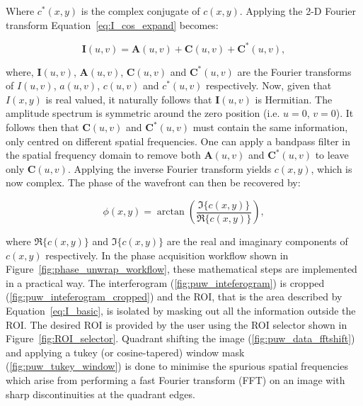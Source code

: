 Where $c^{*}(x,y)$ is the complex conjugate of $c(x,y)$. Applying the 2-D Fourier transform Equation~\ref{eq:I_cos_expand} becomes:

\begin{equation}\label{eq:I_fourier}
\boldsymbol{I}(u,v) = \boldsymbol{A}(u,v) + \boldsymbol{C}(u,v) + \boldsymbol{C}^{*}(u,v),
\end{equation}

where, $\boldsymbol{I}(u,v)$, $\boldsymbol{A}(u,v)$, $\boldsymbol{C}(u,v)$ and  $\boldsymbol{C}^{*}(u,v)$ are the Fourier transforms of $I(u,v)$, $a(u,v)$, $c(u,v)$ and $c^{*}(u,v)$ respectively. Now, given that $I(x,y)$ is real valued, it naturally follows that $\boldsymbol{I}(u,v)$ is Hermitian. The amplitude spectrum is symmetric around the zero position (i.e. $u = 0$, $v = 0$). It follows then that $\boldsymbol{C}(u,v)$ and $\boldsymbol{C}^{*}(u,v)$ must contain the same information, only centred on different spatial frequencies. One can apply a bandpass filter in the spatial frequency domain to remove both $\boldsymbol{A}(u,v)$ and $\boldsymbol{C}^{*}(u,v)$ to leave only $\boldsymbol{C}(u,v)$\cite{lewis1993absolute}. Applying the inverse Fourier transform yields $c(x,y)$, which is now complex. The phase of the wavefront can then be recovered by:

\begin{equation}\label{eq:phase}
\phi(x,y) = \arctan\left(\frac{\Im\{c(x,y)\}}{\Re\{c(x,y)\}}\right),
\end{equation}

where $\Re\{c(x,y)\}$ and $\Im\{c(x,y)\}$ are the real and imaginary components of $c(x,y)$ respectively. In the phase acquisition workflow shown in Figure~\ref{fig:phase_unwrap_workflow}, these mathematical steps are implemented in a practical way. The interferogram (\ref{fig:puw_inteferogram}) is cropped (\ref{fig:puw_inteferogram_cropped}) and the ROI, that is the area described by Equation~\ref{eq:I_basic}, is isolated by masking out all the information outside the ROI. The desired ROI is provided by the user using the ROI selector shown in Figure~\ref{fig:ROI_selector}. Quadrant shifting the image (\ref{fig:puw_data_fftshift}) and applying a tukey (or cosine-tapered) window mask (\ref{fig:puw_tukey_window}) is done to minimise the spurious spatial frequencies which arise from performing a fast Fourier transform (FFT) on an image with sharp discontinuities at the quadrant edges.

